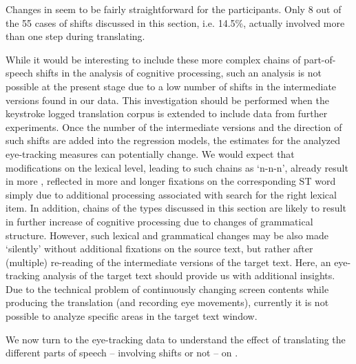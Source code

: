 \documentclass[output=paper]{LSP/langsci}
\begin{document}
Changes in  seem to be fairly straightforward for the participants. Only 8 out of the 55 cases of shifts discussed in this section, i.e. 14.5\%, actually involved more than one step during translating. 

While it would be interesting to include these more complex chains of part-of-speech shifts in the analysis of cognitive processing, such an analysis is not possible at the present stage due to a low number of shifts in the intermediate versions found in our data. This investigation should be performed when the keystroke logged translation corpus is extended to include data from further experiments. Once the number of the intermediate versions and the direction of such shifts are added into the regression models, the estimates for the analyzed eye-tracking measures can potentially change. We would expect that modifications on the lexical level, leading to such chains as `n-n-n', already result in more , reflected in more and longer fixations on the corresponding ST word simply due to additional processing associated with search for the right lexical item. In addition, chains of the types discussed in this section are likely to result in further increase of cognitive processing due to changes of grammatical structure. However, such lexical and grammatical changes may be also made `silently' without additional fixations on the source text, but rather after (multiple) re-reading of the intermediate versions of the target text. Here, an eye-tracking analysis of the target text should provide us with additional insights. Due to the technical problem of continuously changing screen contents while producing the translation (and recording eye movements), currently it is not possible to analyze specific areas in the target text window. 


We now turn to the eye-tracking data to understand the effect of translating the different parts of speech -- involving shifts or not -- on . 
\end{document}
